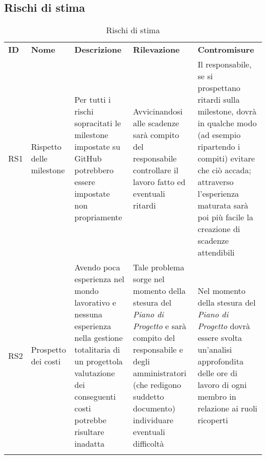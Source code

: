 \subsection{Rischi di stima}
	\begin{longtable} {
		>{}p{10mm} 
		>{}p{24mm}
		>{}p{32mm} 
		>{}p{32mm}
		>{}p{32mm}
		}
	\rowcolor{gray!50}
		\textbf{ID} & \textbf{Nome} & \textbf{Descrizione} & \textbf{Rilevazione} & \textbf{Contromisure} 	\TBstrut \\
		RS1 & Rispetto delle milestone & Per tutti i rischi sopracitati le milestone impostate su GitHub potrebbero essere impostate non propriamente & Avvicinandosi alle scadenze sarà compito del responsabile controllare il lavoro fatto ed eventuali ritardi & Il responsabile, se si prospettano ritardi sulla milestone, dovrà in qualche modo (ad esempio ripartendo i compiti) evitare che ciò accada; attraverso l'esperienza maturata sarà poi più facile la creazione di scadenze attendibili \TBstrut \\ [2mm]
		RS2 & Prospetto dei costi & Avendo poca esperienza nel mondo lavorativo e nessuna esperienza nella gestione totalitaria di un progetto\glosp la valutazione dei conseguenti costi potrebbe risultare inadatta & Tale problema sorge nel momento della stesura del \textit{Piano di Progetto} e sarà compito del responsabile e degli amministratori (che redigono suddetto documento) individuare eventuali difficoltà & Nel momento della stesura del \textit{Piano di Progetto} dovrà essere svolta un'analisi approfondita delle ore di lavoro di ogni membro in relazione ai ruoli ricoperti \TBstrut \\ [2mm]
		\rowcolor{white}
		\caption{Rischi di stima}
	\end{longtable}
\pagebreak
